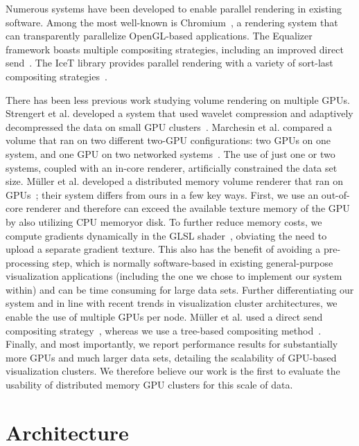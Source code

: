 Numerous systems have been developed to enable parallel rendering in
existing software.  Among the most well-known is
Chromium~\cite{HHN:2002:???}, a rendering system that can transparently
parallelize OpenGL-based applications.  The Equalizer framework boasts
multiple compositing strategies, including an improved direct
send~\cite{EP:2007:???}.  The IceT library provides parallel rendering
with a variety of sort-last compositing strategies~\cite{MWP:2001:???}.

There has been less previous work studying volume rendering on
multiple GPUs.  Strengert et al. developed a system that used wavelet
compression and adaptively decompressed the data on small GPU
clusters~\cite{SMW:2004:???}.  Marchesin et al. compared a volume that
ran on two different two-GPU configurations: two GPUs on one system,
and one GPU on two networked systems~\cite{Marchesin:2008:???}.  The
use of just one or two systems, coupled with an in-core renderer,
artificially constrained the data set size.  M\"uller et al. developed
a distributed memory volume renderer that ran on
GPUs~\cite{Mueller:2006:???}; their system differs from ours in a few
key ways.  First, we use an out-of-core renderer and therefore can
exceed the available texture memory of the GPU by also utilizing CPU
memoryor disk.  To further reduce memory costs, we compute gradients
dynamically in the GLSL shader~\cite{KW:2003:???}, obviating the need
to upload a separate gradient texture.  This also has the benefit of
avoiding a pre-processing step, which is normally software-based in
existing general-purpose visualization applications (including the one
we chose to implement our system within) and can be time consuming for
large data sets.  Further differentiating our system and in line with
recent trends in visualization cluster architectures, we enable the use
of multiple GPUs per node.  M\"uller et al. used a direct send
compositing strategy~\cite{Hsu:1993:???, MPHK:1993:???}, whereas we use
a tree-based compositing method~\cite{MWP:2001:???}.  Finally, and
most importantly, we report performance results for substantially more
GPUs and much larger data sets, detailing the scalability of GPU-based
visualization clusters.  We therefore believe our work is the first
to evaluate the usability of distributed memory GPU clusters for this
scale of data.

\section{Architecture}
\label{sec:arch}


